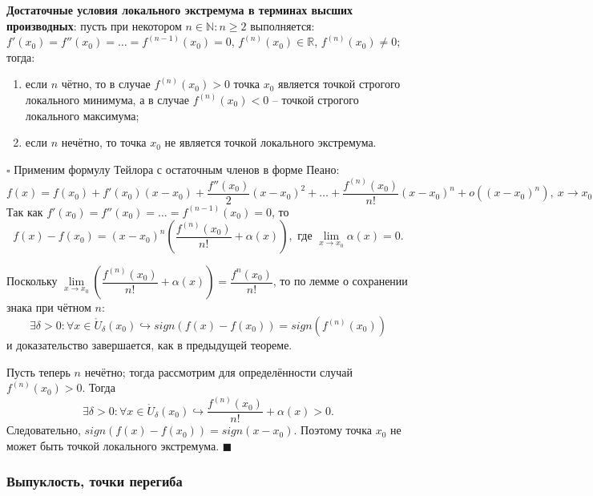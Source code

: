 \documentclass[12pt, a4paper, reqno]{article}
\begin{document}
    \textbf{Достаточные условия локального экстремума в терминах высших производных}: пусть при
    некотором $n\in\mathbb{N}: n\geq 2$ выполняется: $f'(x_0) = f''(x_0) = \ldots = f^{(n - 1)}(x_0) = 0$,
    $f^{(n)}(x_0)\in\mathbb{R}$, $f^{(n)}(x_0)\neq 0$; тогда:
    \begin{enumerate}
        \item если $n$ чётно, то в случае $f^{(n)}(x_0) > 0$ точка $x_0$ является точкой строгого
        локального минимума, а в случае $f^{(n)}(x_0) < 0$ -- точкой строгого локального максимума;
        \item если $n$ нечётно, то точка $x_0$ не является точкой локального экстремума.
    \end{enumerate}

    $\square$ Применим формулу Тейлора с остаточным членов в форме Пеано:
    \begin{equation*}
        f(x) = f(x_0) + f'(x_0)(x - x_0) + \dfrac{f''(x_0)}{2}(x - x_0)^2 + \ldots +
        \dfrac{f^{(n)}(x_0)}{n!}(x - x_0)^n + o\left((x - x_0)^n\right),\ x \to x_0
    \end{equation*}
    Так как $f'(x_0) = f''(x_0) = \ldots = f^{(n - 1)}(x_0) = 0$, то
    \begin{equation*}
        f(x) - f(x_0) = (x - x_0)^n\left(\dfrac{f^{(n)}(x_0)}{n!} + \alpha(x)\right),
        \text{ где }\lim\limits_{x\to x_0} \alpha(x) = 0.
    \end{equation*}

    Поскольку $\lim\limits_{x\to x_0} \left(\dfrac{f^{(n)}(x_0)}{n!} + \alpha(x)\right) =
    \dfrac{f^{n}(x_0)}{n!}$, то по лемме о сохранении знака при чётном $n$:
    \begin{equation*}
        \exists\delta > 0: \forall x\in\mathring U_{\delta}(x_0)\hookrightarrow sign(f(x) - f(x_0))
        = sign(f^{(n)}(x_0))
    \end{equation*}
    и доказательство завершается, как в предыдущей теореме.

    Пусть теперь $n$ нечётно; тогда рассмотрим для определённости случай $f^{(n)}(x_0) > 0$. Тогда
    \begin{equation*}
        \exists\delta > 0: \forall x\in\mathring U_{\delta}(x_0)\hookrightarrow
        \dfrac{f^{(n)}(x_0)}{n!} + \alpha(x) > 0.
    \end{equation*}
    Следовательно, $sign(f(x) - f(x_0)) = sign(x - x_0)$. Поэтому точка $x_0$ не может быть точкой
    локального экстремума. $\blacksquare$

    \subsubsection{Выпуклость, точки перегиба}
\end{document}
